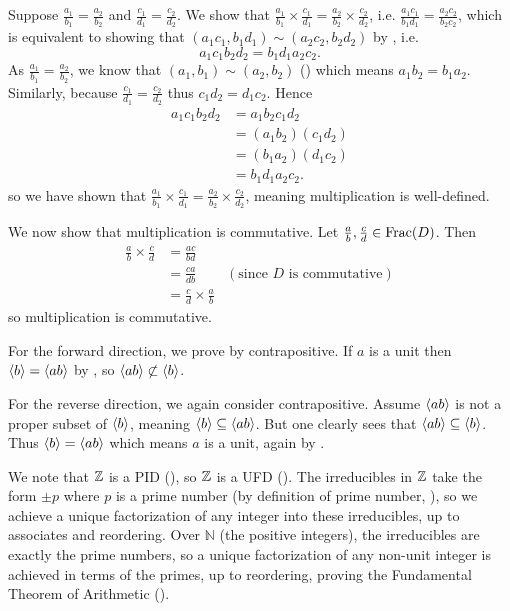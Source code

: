 \begin{questions}
    \item Suppose $\frac{a_1}{b_1} = \frac{a_2}{b_2}$ and $\frac{c_1}{d_1} = \frac{c_2}{d_2}$. We show that $\frac{a_1}{b_1} \times \frac{c_1}{d_1} = \frac{a_2}{b_2} \times \frac{c_2}{d_2}$, i.e. $\frac{a_1c_1}{b_1d_1} = \frac{a_2c_2}{b_2c_2}$, which is equivalent to showing that $(a_1c_1, b_1d_1) \mathrel{\sim} (a_2c_2, b_2d_2)$ by , i.e.
    \[
        a_1c_1b_2d_2 = b_1d_1a_2c_2.
    \]
    As $\frac{a_1}{b_1} = \frac{a_2}{b_2}$, we know that $(a_1, b_1) \mathrel{\sim} (a_2, b_2)$ () which means $a_1b_2 = b_1a_2$. Similarly, because $\frac{c_1}{d_1} = \frac{c_2}{d_2}$ thus $c_1d_2 = d_1c_2$. Hence
    \begin{align*}
        a_1c_1b_2d_2 &= a_1b_2c_1d_2\\
        &= (a_1b_2)(c_1d_2)\\
        &= (b_1a_2)(d_1c_2)\\
        &= b_1d_1a_2c_2.
    \end{align*}
    so we have shown that $\frac{a_1}{b_1} \times \frac{c_1}{d_1} = \frac{a_2}{b_2} \times \frac{c_2}{d_2}$, meaning multiplication is well-defined.

    We now show that multiplication is commutative. Let $\frac ab, \frac cd \in \mathrm{Frac}(D)$. Then
    \begin{align*}
        \frac ab \times \frac cd &= \frac{ac}{bd}\\
        &= \frac{ca}{db} & (\text{since } D \text{ is commutative})\\
        &= \frac cd \times \frac ab
    \end{align*}
    so multiplication is commutative.

    \item For the forward direction, we prove by contrapositive. If $a$ is a unit then $\left\langle b\right\rangle = \left\langle ab\right\rangle$ by , so $\left\langle ab\right\rangle \not\subset \left\langle b\right\rangle$.
    
    For the reverse direction, we again consider contrapositive. Assume $\left\langle ab\right\rangle$ is not a proper subset of $\left\langle b\right\rangle$, meaning $\left\langle b\right\rangle \subseteq \left\langle ab\right\rangle$. But one clearly sees that $\left\langle ab\right\rangle \subseteq \left\langle b\right\rangle$. Thus $\left\langle b\right\rangle = \left\langle ab\right\rangle$ which means $a$ is a unit, again by .

    \item We note that $\mathbb{Z}$ is a PID (), so $\mathbb{Z}$ is a UFD (). The irreducibles in $\mathbb{Z}$ take the form $\pm p$ where $p$ is a prime number (by definition of prime number, ), so we achieve a unique factorization of any integer into these irreducibles, up to associates and reordering. Over $\mathbb{N}$ (the positive integers), the irreducibles are exactly the prime numbers, so a unique factorization of any non-unit integer is achieved in terms of the primes, up to reordering, proving the Fundamental Theorem of Arithmetic ().
\end{questions}

